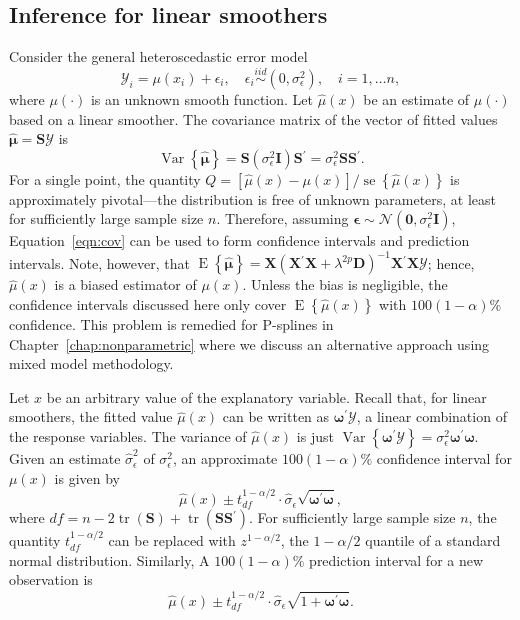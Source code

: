 \documentclass[cmfont,usenames,dvipsnames,leqno]{afit-etd}\usepackage[]{graphicx}\usepackage[]{color}
\newcommand{\trans}{\ensuremath{^\prime}}
\newcommand{\bc}[1]{\ensuremath{\bm{\mathcal{#1}}}}
\newcommand{\mc}[1]{\ensuremath{\mathcal{#1}}}
\newcommand{\wh}[1]{\ensuremath{\widehat{#1}}}
\newcommand{\E}{\operatorname{E}}
\newcommand{\var}{\operatorname{Var}}
\newcommand{\se}{\operatorname{se}}
\newcommand{\tr}{\operatorname{tr}}
\newcommand{\X}{\ensuremath{\bm{X}}}
\begin{document}
\subsection{Inference for linear smoothers}
\label{sec:pspline-inference}
Consider the general heteroscedastic error model
\begin{equation*}
  \mc{Y}_i = \mu(x_i) + \epsilon_i, \quad \epsilon_i \stackrel{iid}{\sim} (0, \sigma_\epsilon^2), \quad i = 1, \dotsc n,
\end{equation*}
where $\mu(\cdot)$ is an unknown smooth function. Let $\wh{\mu}(x)$ be an estimate of $\mu(\cdot)$ based on a linear smoother. The covariance matrix of the vector of fitted values $\wh{\bm{\mu}} = \bm{S}\bc{Y}$ is 
\begin{equation}
\label{eqn:cov}
  \var\left\{\wh{\bm{\mu}}\right\} = \bm{S}\left( \sigma_\epsilon^2\bm{I} \right) \bm{S}\trans = \sigma_\epsilon^2   \bm{S}\bm{S}\trans.
\end{equation}
For a single point, the quantity $Q = \left[ \wh{\mu}(x) - \mu(x) \right]/\se\left\{ \wh{\mu}(x) \right\}$ is approximately pivotal---the distribution is free of unknown parameters, at least for sufficiently large sample size $n$. Therefore, assuming $\bm{\epsilon} \sim \mc{N}(\bm{0}, \sigma_\epsilon^2\bm{I})$, Equation~\eqref{eqn:cov} can be used to form confidence intervals and prediction intervals. Note, however, that $\E\left\{\wh{\bm{\mu}}\right\} = \X\left( \X\trans\X + \lambda^{2p}\bm{D} \right)^{-1}\X\trans\X\bc{Y}$; hence, $\wh{\mu}(x)$ is a biased estimator of $\mu(x)$. Unless the bias is negligible, the confidence intervals discussed here only cover $\E\left\{\wh{\mu}(x)\right\}$ with $100(1 - \alpha)\%$ confidence. This problem is remedied for \acp{P-spline} in Chapter~\ref{chap:nonparametric} where we discuss an alternative approach using mixed model methodology.  

Let $x$ be an arbitrary value of the explanatory variable. Recall that, for linear smoothers, the fitted value $\wh{\mu}(x)$ can be written as $\bm{\omega}\trans\bc{Y}$, a linear combination of the response variables. The variance of $\wh{\mu}(x)$ is just $\var\left\{\bm{\omega}\trans\bc{Y}\right\} = \sigma_\epsilon^2\bm{\omega}\trans\bm{\omega}$. Given an estimate $\wh{\sigma}_\epsilon^2$ of $\sigma_\epsilon^2$, an approximate $100(1 - \alpha)\%$ confidence interval for $\mu(x)$ is given by 
\begin{equation*}
  \wh{\mu}(x) \pm t_{df}^{1 - \alpha/2} \cdot \wh{\sigma}_\epsilon \sqrt{\bm{\omega}\trans\bm{\omega}},
\end{equation*}
where $df = n - 2\tr\left( \bm{S} \right) + \tr\left( \bm{S}\bm{S}\trans \right)$. For sufficiently large sample size $n$, the quantity $t_{df}^{1 - \alpha/2}$ can be replaced with $z^{1 - \alpha/2}$, the $1 - \alpha/2$ quantile of a standard normal distribution. Similarly, A $100(1 - \alpha)\%$ prediction interval for a new observation is 
\begin{equation*}
  \wh{\mu}(x) \pm t_{df}^{1 - \alpha/2} \cdot \wh{\sigma}_\epsilon \sqrt{1 + \bm{\omega}\trans\bm{\omega}}.
\end{equation*}
\end{document}
